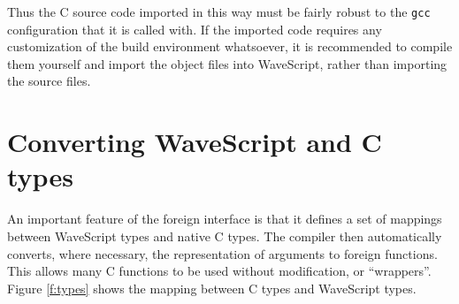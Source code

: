 Thus the C source code imported in this way must be fairly
robust to the {\tt gcc} configuration that it is called with.
If the imported code requires any customization of
the build environment whatsoever, it is recommended to compile them
yourself and import the object files into WaveScript, rather than
importing the source files.





\section{Converting WaveScript and C types}

An important feature of the foreign interface is that it defines a set
of mappings between WaveScript types and native C types.  The compiler
then automatically converts, where necessary, the representation of arguments to foreign
functions.
This allows many C functions to be used without modification, or ``wrappers''.  Figure
\ref{f:types} shows the mapping between C types and WaveScript types.


